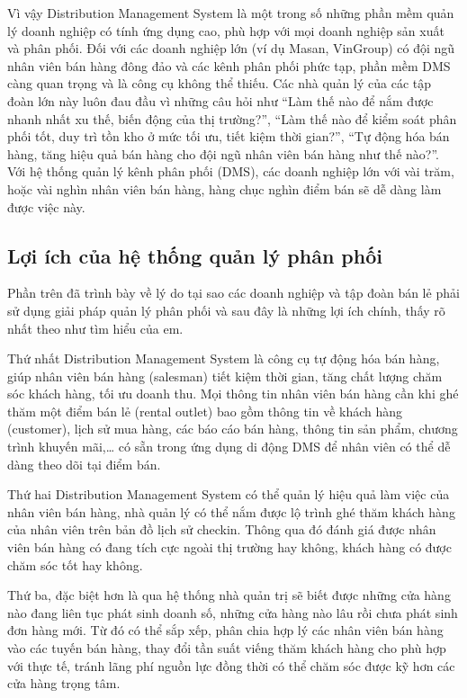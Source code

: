 Vì vậy Distribution Management System là một trong số những
phần mềm quản lý doanh nghiệp có tính ứng dụng cao, phù hợp với mọi
doanh nghiệp sản xuất và phân phối. Đối với các doanh nghiệp lớn
(ví dụ Masan, VinGroup) có đội ngũ nhân viên bán hàng đông đảo và các
kênh phân phối phức tạp, phần mềm DMS càng quan trọng và là công cụ không
thể thiếu. Các nhà quản lý của các tập đoàn lớn này luôn đau đầu vì
những câu hỏi như “Làm thế nào để nắm được nhanh nhất xu thế, biến động
của thị trường?”, “Làm thế nào để kiểm soát phân phối tốt, duy
trì tồn kho ở mức tối ưu, tiết kiệm thời gian?”, “Tự động hóa bán
hàng, tăng hiệu quả bán hàng cho đội ngũ nhân viên bán hàng như
thế nào?”. Với hệ thống quản lý kênh phân phối (DMS), các doanh nghiệp
lớn với vài trăm, hoặc vài nghìn nhân viên bán hàng, hàng chục
nghìn điểm bán sẽ dễ dàng làm được việc này.

\subsection{Lợi ích của hệ thống quản lý phân phối}
Phần trên đã trình bày về lý do tại sao các doanh nghiệp và tập
đoàn bán lẻ phải sử dụng giải pháp quản lý phân phối và sau đây
là những lợi ích chính, thấy rõ nhất theo như tìm hiểu của em.

Thứ nhất Distribution Management System là công cụ tự động hóa
bán hàng, giúp nhân viên bán hàng (salesman) tiết kiệm thời gian,
tăng chất lượng chăm sóc khách hàng, tối ưu doanh thu. Mọi thông
tin nhân viên bán hàng cần khi ghé thăm một điểm bán lẻ (rental outlet) 
bao gồm thông tin về khách hàng (customer), lịch sử mua hàng, 
các báo cáo bán hàng, thông tin sản phẩm, chương trình khuyến mãi,… 
có sẵn trong ứng dụng di động DMS để nhân viên có thể dễ dàng theo
dõi tại điểm bán.

Thứ hai Distribution Management System có thể quản lý hiệu quả
làm việc của nhân viên bán hàng, nhà quản lý có thể nắm được lộ
trình ghé thăm khách hàng của nhân viên trên bản đồ lịch sử checkin.
Thông qua đó đánh giá được nhân viên bán hàng có đang tích cực
ngoài thị trường hay không, khách hàng có được chăm sóc tốt hay không.

Thứ ba, đặc biệt hơn là qua hệ thống nhà quản trị sẽ biết
được những cửa hàng nào đang liên tục phát sinh doanh số, những cửa hàng
nào lâu rồi chưa phát sinh đơn hàng mới. Từ đó có thể sắp xếp,
phân chia hợp lý các nhân viên bán hàng vào các tuyến bán
hàng, thay đổi tần suất viếng thăm khách hàng cho phù hợp với
thực tế, tránh lãng phí nguồn lực đồng thời có thể chăm sóc được kỹ
hơn các cửa hàng trọng tâm.

